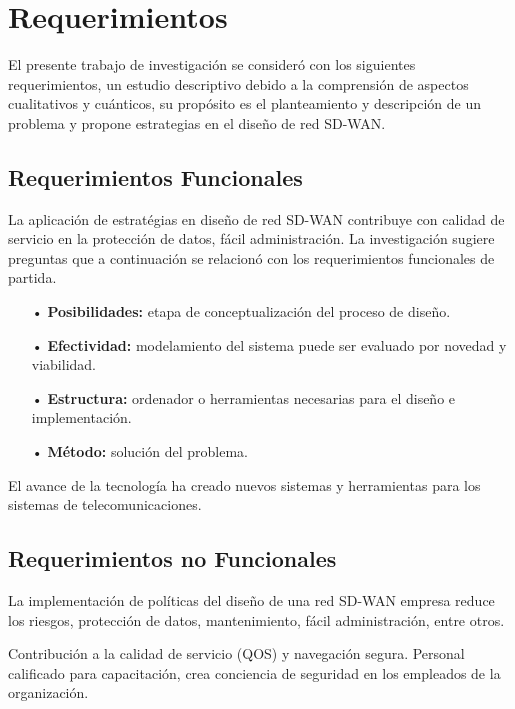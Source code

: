 \chapter{Requerimientos}
\label{cha:Requerimientos}

El presente trabajo de investigación se consideró con los siguientes requerimientos, un estudio descriptivo debido a la comprensión de aspectos cualitativos y cuánticos, su propósito es el planteamiento y descripción de un problema y propone estrategias en el diseño de red SD-WAN.

\section{Requerimientos Funcionales}
\label{sec:Requerimientos Funcionales}

La aplicación de estratégias en diseño de red SD-WAN contribuye con calidad de servicio en la protección de datos, fácil administración. La investigación sugiere preguntas que a continuación se relacionó con los requerimientos funcionales de partida.

\begin{itemize}
\item[•]\textbf{Posibilidades:} etapa de conceptualización del proceso de diseño.
\item[•]\textbf{Efectividad:} modelamiento del sistema puede ser evaluado por novedad y viabilidad.
\item[•]\textbf{Estructura:} ordenador o herramientas necesarias para el diseño e implementación.
\item[•]\textbf{Método:} solución del problema.
\end{itemize}
El avance de la tecnología ha creado nuevos sistemas y herramientas para los sistemas de telecomunicaciones.

\section{Requerimientos no Funcionales}
\label{sec:Requerimientos no Funcionales}
La implementación de políticas del diseño de una red SD-WAN empresa reduce los riesgos, protección de datos, mantenimiento, fácil administración, entre otros.

Contribución a la calidad de servicio (QOS) y navegación segura. Personal calificado para capacitación, crea conciencia de seguridad en los empleados de la organización.
